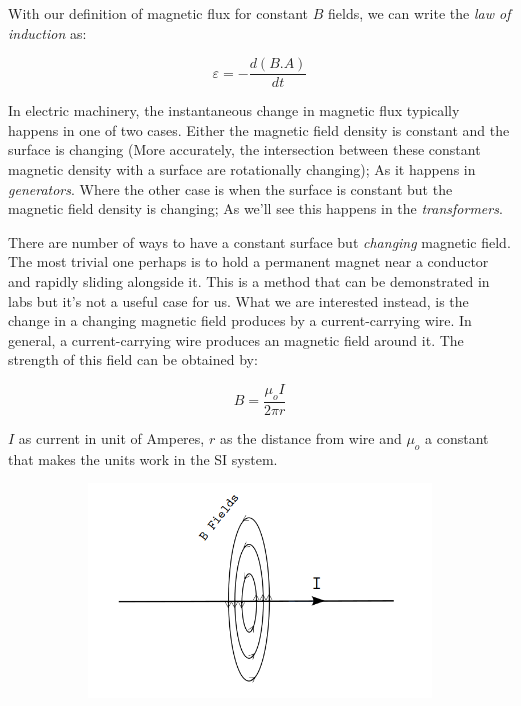 \documentclass{article}
\begin{document}
	
	With our definition of magnetic flux for constant $B$ fields, we can write the \textit{law of induction} as:

	$$ \varepsilon = -\frac{d(B.A)}{d t} $$
	
	In electric machinery, the instantaneous change in magnetic flux typically happens in one of two cases.
	Either the magnetic field density is constant and the surface is changing (More accurately, the intersection between these constant magnetic density with a surface are rotationally changing); As it happens in \textit{generators}.
	Where the other case is when the surface is constant but the magnetic field density is changing; As we'll see this happens in the \textit{transformers}.

	There are number of ways to have a constant surface but \textit{changing} magnetic field.
	The most trivial one perhaps is to hold a permanent magnet near a conductor and rapidly sliding alongside it.
	This is a method that can be demonstrated in labs but it's not a useful case for us. 
	What we are interested instead, is the change in a changing magnetic field produces by a current-carrying wire. 
	In general, a current-carrying wire produces an magnetic field around it.
	The strength of this field can be obtained by:

	$$ B = \frac{\mu_o I}{2 \pi r} $$
	
	$I$ as current in unit of Amperes, $r$ as the distance from wire and $\mu_o$ a constant that makes the units work in the SI system.

	\begin{figure}[h!]
	\centering
	\begin{subfigure}[b]{0.8\linewidth}
		\includegraphics[width=\linewidth]{magnetic_field_around_a_wire.png}
	\end{subfigure}
	\end{figure}
\end{document}
